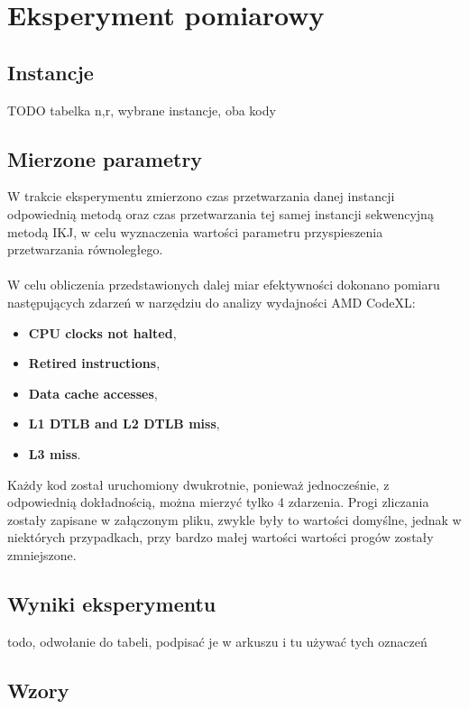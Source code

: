 \documentclass[12pt,a4paper]{article}
\begin{document}
\section{Eksperyment pomiarowy}

\subsection{Instancje}

TODO tabelka n,r, wybrane instancje, oba kody

\subsection{Mierzone parametry}

W trakcie eksperymentu zmierzono czas przetwarzania danej instancji odpowiednią metodą oraz czas przetwarzania tej samej instancji sekwencyjną metodą IKJ, w celu wyznaczenia wartości parametru przyspieszenia przetwarzania równoległego.\\
\\
W celu obliczenia przedstawionych dalej miar efektywności dokonano pomiaru następujących zdarzeń w narzędziu do analizy wydajności AMD CodeXL:

\begin{itemize}
\item \textbf{CPU clocks not halted},
\item \textbf{Retired instructions},
\item \textbf{Data cache accesses},
\item \textbf{L1 DTLB and L2 DTLB miss},
\item \textbf{L3 miss}.
\end{itemize}

Każdy kod został uruchomiony dwukrotnie, ponieważ jednocześnie, z odpowiednią dokładnością, można mierzyć tylko 4 zdarzenia. Progi zliczania zostały zapisane w załączonym pliku, zwykle były to wartości domyślne, jednak w niektórych przypadkach, przy bardzo małej wartości wartości progów zostały zmniejszone.

\subsection{Wyniki eksperymentu}

todo, odwołanie do tabeli, podpisać je w arkuszu i tu używać tych oznaczeń

\subsection{Wzory}
\end{document}
